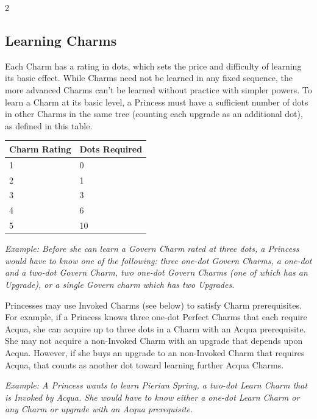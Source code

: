 \begin{multicols}{2}
\subsection*{Learning Charms}

Each Charm has a rating in dots, which sets the price and difficulty of learning its basic effect. While Charms need not be learned in any fixed sequence, the more advanced Charms can't be learned without practice with simpler powers. To learn a Charm at its basic level, a Princess must have a sufficient number of dots in other Charms in the same tree (counting each upgrade as an additional dot), as defined in this table. 

\begin{mybox}

    \begin{tabular}{|l|l|}
        \hline
        Charm Rating & Dots Required \\ \hline
        1            & 0             \\ \hline
        2            & 1             \\ \hline
        3            & 3             \\ \hline
        4            & 6             \\ \hline
        5            & 10            \\
        \hline
    \end{tabular}

\end{mybox}
    
\textit{Example: Before she can learn a Govern Charm rated at three dots, a Princess would have to know one of the following: three one-dot Govern Charms, a one-dot and a two-dot Govern Charm, two one-dot Govern Charms (one of which has an Upgrade), or a single Govern charm which has two Upgrades.}

Princesses may use Invoked Charms (see below) to satisfy Charm prerequisites. For example, if a Princess knows three one-dot Perfect Charms that each require Acqua, she can acquire up to three dots in a Charm with an Acqua prerequisite. She may not acquire a non-Invoked Charm with an upgrade that depends upon Acqua. However, if she buys an upgrade to an non-Invoked Charm that requires Acqua, that counts as another dot toward learning further Acqua Charms. 

\textit{Example: A Princess wants to learn Pierian Spring, a two-dot Learn Charm that is Invoked by Acqua. She would have to know either a one-dot Learn Charm or any Charm or upgrade with an Acqua prerequisite.}


\end{multicols}
